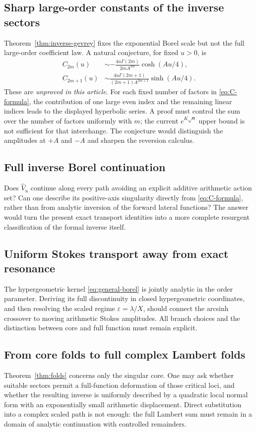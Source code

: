 \documentclass[11pt,a4paper]{article}
\numberwithin{equation}{section}
\theoremstyle{definition}\newtheorem{definition}[theorem]{Definition}
\theoremstyle{remark}\newtheorem{remark}[theorem]{Remark}
\newcommand{\eps}{\varepsilon}
\begin{document}
\subsection{Sharp large-order constants of the inverse sectors}
Theorem~\ref{thm:inverse-gevrey} fixes the exponential Borel scale but
not the full large-order coefficient law. A natural conjecture, for
fixed $u>0$, is
\begin{align}
 C_{2m}(u)&\sim-\frac{4u\Gamma(2m)}{2mA^{2m}}
                         \cosh(Au/4),\label{eq:conj-even}\\
 C_{2m+1}(u)&\sim\frac{4u\Gamma(2m+1)}{(2m+1)A^{2m+1}}
                         \sinh(Au/4).\label{eq:conj-odd}
\end{align}
These are \emph{unproved in this article}. For each fixed number of
factors in \eqref{eq:C-formula}, the contribution of one large even
index and the remaining linear indices leads to the displayed
hyperbolic series. A proof must control the sum over the number of
factors uniformly with $m$; the current $e^{K\sqrt n}$ upper bound
is not sufficient for that interchange. The conjecture would distinguish
the amplitudes at $+A$ and $-A$ and sharpen the reversion calculus.

\subsection{Full inverse Borel continuation}
Does $\widehat V_u$ continue along every path avoiding an explicit
additive arithmetic action set? Can one describe its positive-axis
singularity directly from \eqref{eq:C-formula}, rather than from
analytic inversion of the forward lateral functions? The answer would
turn the present exact transport identities into a more complete
resurgent classification of the formal inverse itself.

\subsection{Uniform Stokes transport away from exact resonance}
The hypergeometric kernel \eqref{eq:general-borel} is jointly analytic
in the order parameter. Deriving its full discontinuity in closed
hypergeometric coordinates, and then resolving the scaled regime
$\eps=\lambda/X$, should connect the arcsinh crossover to moving
arithmetic Stokes amplitudes. All branch choices and the distinction
between core and full function must remain explicit.

\subsection{From core folds to full complex Lambert folds}
Theorem~\ref{thm:folds} concerns only the singular core. One may ask
whether suitable sectors permit a full-function deformation of those
critical loci, and whether the resulting inverse is uniformly described
by a quadratic local normal form with an exponentially small
arithmetic displacement. Direct substitution into a complex scaled
path is not enough: the full Lambert sum must remain in a domain of
analytic continuation with controlled remainders.
\end{document}
